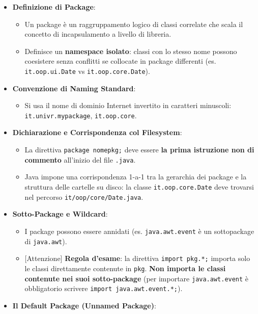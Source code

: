\documentclass[11pt,a4paper,oneside]{report}
\newcommand{\passthrough}[1]{#1}
\providecommand{\tightlist}{\setlength{\itemsep}{0pt}\setlength{\parskip}{0pt}}
\begin{document}
\begin{itemize}
\tightlist
\item
  \textbf{Definizione di Package}:

  \begin{itemize}
  \tightlist
  \item
    Un package è un raggruppamento logico di classi correlate che scala
    il concetto di incapsulamento a livello di libreria.
  \item
    Definisce un \textbf{namespace isolato}: classi con lo stesso nome
    possono coesistere senza conflitti se collocate in package
    differenti (es. \passthrough{\lstinline!it.oop.ui.Date!} vs
    \passthrough{\lstinline!it.oop.core.Date!}).
  \end{itemize}
\item
  \textbf{Convenzione di Naming Standard}:

  \begin{itemize}
  \tightlist
  \item
    Si usa il nome di dominio Internet invertito in caratteri minuscoli:
    \passthrough{\lstinline!it.univr.mypackage!},
    \passthrough{\lstinline!it.oop.core!}.
  \end{itemize}
\item
  \textbf{Dichiarazione e Corrispondenza col Filesystem}:

  \begin{itemize}
  \tightlist
  \item
    La direttiva \passthrough{\lstinline!package nomepkg;!} deve essere
    \textbf{la prima istruzione non di commento} all'inizio del file
    \passthrough{\lstinline!.java!}.
  \item
    Java impone una corrispondenza 1-a-1 tra la gerarchia dei package e
    la struttura delle cartelle su disco: la classe
    \passthrough{\lstinline!it.oop.core.Date!} deve trovarsi nel
    percorso \passthrough{\lstinline!it/oop/core/Date.java!}.
  \end{itemize}
\item
  \textbf{Sotto-Package e Wildcard}:

  \begin{itemize}
  \tightlist
  \item
    I package possono essere annidati (es.
    \passthrough{\lstinline!java.awt.event!} è un sottopackage di
    \passthrough{\lstinline!java.awt!}).
  \item
    {[}Attenzione{]} \textbf{Regola d'esame}: la direttiva
    \passthrough{\lstinline!import pkg.*;!} importa solo le classi
    direttamente contenute in \passthrough{\lstinline!pkg!}. \textbf{Non
    importa le classi contenute nei suoi sotto-package} (per importare
    \passthrough{\lstinline!java.awt.event!} è obbligatorio scrivere
    \passthrough{\lstinline!import java.awt.event.*;!}).
  \end{itemize}
\item
  \textbf{Il Default Package (Unnamed Package)}:


\end{itemize}
\end{document}
